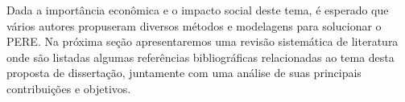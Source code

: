 Dada a import\^ancia econ\^omica e o impacto social deste tema, é esperado que v\'arios autores propuseram diversos m\'etodos e modelagens para solucionar o \ac{PERE}. Na pr\'oxima seç\~ao apresentaremos uma revis\~ao sistem\'atica de literatura onde s\~ao listadas algumas refer\^encias bibliogr\'aficas relacionadas ao tema desta proposta de dissertaç\~ao, juntamente com uma an\'alise de suas principais contribuiç\~oes e objetivos.






